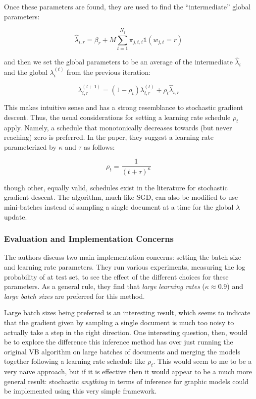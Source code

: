 \documentclass[11pt]{article}
\begin{document}
Once these parameters are found, they are used to find the ``intermediate''
global parameters:

\begin{equation}
\hat{\lambda}_{i,r} = \beta_r + M \sum_{t=1}^{N_j}
\pi_{j,t,i}\mathbb{1}(w_{j,t} = r)
\end{equation}

and then we set the global parameters to be an average of the intermediate
$\hat{\lambda}_i$ and the global $\lambda_i^{(t)}$ from the previous
iteration:

\begin{equation}
  \lambda_{i,r}^{(t+1)} = (1-\rho_t)\lambda_{i,r}^{(t)} +
  \rho_t\hat{\lambda}_{i,r}
\end{equation}

This makes intuitive sense and has a strong resemblance to stochastic
gradient descent. Thus, the usual considerations for setting a learning
rate schedule $\rho_t$ apply. Namely, a schedule that monotonically
decreases towards (but never reaching) zero is preferred. In the paper,
they suggest a learning rate parameterized by $\kappa$ and $\tau$ as
follows:

\begin{equation}
  \rho_t = \frac{1}{(t+\tau)^\kappa}
\end{equation}

though other, equally valid, schedules exist in the literature for
stochastic gradient descent. The algorithm, much like SGD, can also be
modified to use mini-batches instead of sampling a single document at a
time for the global $\lambda$ update.

\subsubsection{Evaluation and Implementation Concerns}

The authors discuss two main implementation concerns: setting the batch
size and learning rate parameters. They run various experiments, measuring
the log probability of at test set, to see the effect of the different
choices for these parameters. As a general rule, they find that \emph{large
learning rates} ($\kappa \approx 0.9$) and \emph{large batch sizes} are
preferred for this method.

Large batch sizes being preferred is an interesting result, which seems to
indicate that the gradient given by sampling a single document is much too
noisy to actually take a step in the right direction. One interesting
question, then, would be to explore the difference this inference method
has over just running the original VB algorithm on large batches of
documents and merging the models together following a learning rate
schedule like $\rho_t$. This would seem to me to be a very na\"ive
approach, but if it is effective then it would appear to be a much more
general result: stochastic \emph{anything} in terms of inference for
graphic models could be implemented using this very simple framework.
\end{document}
